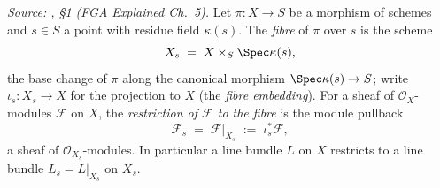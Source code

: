\begin{definition}\leanok
  \label{def:fiber_module_restriction}
  \textit{Source: \cite{nitsure-hilbert-quot}, \S 1 (FGA Explained Ch.~5).}
  Let \(\pi : X \to S\) be a morphism of schemes and \(s \in S\) a point with
  residue field \(\kappa(s)\). The \emph{fibre} of \(\pi\) over \(s\) is the
  scheme
  \[
    X_s \;=\; X \times_S \Spec \kappa(s),
  \]
  the base change of \(\pi\) along the canonical morphism
  \(\Spec \kappa(s) \to S\); write \(\iota_s : X_s \to X\) for the projection
  to \(X\) (the \emph{fibre embedding}). For a sheaf of
  \(\mathcal{O}_X\)-modules \(\mathcal{F}\) on \(X\), the \emph{restriction of
  \(\mathcal{F}\) to the fibre} is the module pullback
  \[
    \mathcal{F}_s \;=\; \mathcal{F}|_{X_s} \;:=\; \iota_s^{*} \mathcal{F},
  \]
  a sheaf of \(\mathcal{O}_{X_s}\)-modules. In particular a line bundle \(L\)
  on \(X\) restricts to a line bundle \(L_s = L|_{X_s}\) on \(X_s\).
\end{definition}

